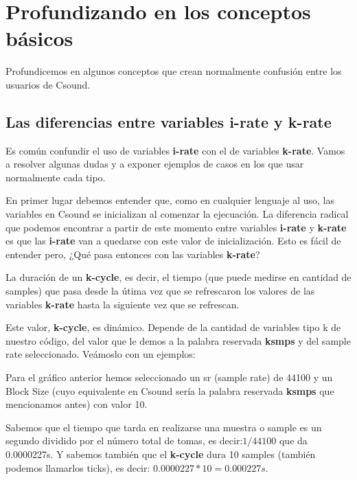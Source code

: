 
\chapter{Profundizando en los conceptos básicos}

Profundicemos en algunos conceptos que crean normalmente confusión entre los usuarios de Csound.

\section{Las diferencias entre variables i-rate y k-rate}

Es común confundir el uso de variables \textbf{i-rate} con el de variables \textbf{k-rate}. Vamos a resolver algunas dudas y a exponer ejemplos de casos en los que usar normalmente cada tipo.

En primer lugar  debemos entender que, como en cualquier lenguaje al uso, las variables en Csound se inicializan al comenzar la ejecuación. La diferencia radical que podemos encontrar a partir de este momento entre variables \textbf{i-rate} y \textbf{k-rate} es que las \textbf{i-rate} van a quedarse con este valor de inicialización. Esto es fácil de entender pero, ¿Qué pasa entonces con las variables \textbf{k-rate}?\bigskip

La duración de un \textbf{k-cycle}, es decir, el tiempo (que puede medirse en cantidad de samples) que pasa desde la útima vez que se refrescaron los valores de las variables \textbf{k-rate} hasta la siguiente vez que se refrescan.

Este valor, \textbf{k-cycle}, es dinámico. Depende de la cantidad de variables tipo k de nuestro código, del valor que le demos a la palabra reservada \textbf{ksmps} y del sample rate seleccionado. Veámoslo con un ejemplos:



Para el gráfico anterior hemos seleccionado un sr (sample rate) de 44100 y un Block Size (cuyo equivalente en Csound sería la palabra reservada \textbf{ksmps} que mencionamos antes) con valor 10.

Sabemos que el tiempo que tarda en realizarse una muestra o sample es un segundo dividido por el número total de tomas, es decir:\( 1/44100\) que da 0.0000227s.
Y sabemos también que el \textbf{k-cycle} dura 10 samples (también podemos llamarlos ticks), es decir: \( 0.0000227*10= 0.000227s \).

